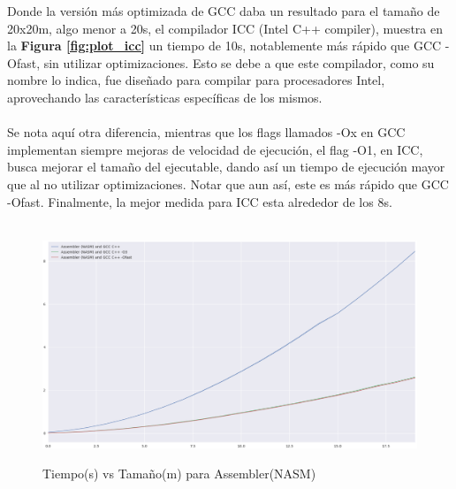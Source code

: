 Donde la versión más optimizada de GCC daba un resultado para el tamaño de 20x20m, algo menor a 20s, el compilador ICC (Intel C++ compiler), muestra en la \textbf{Figura \ref{fig:plot_icc}} un tiempo de 10s, notablemente más rápido que  GCC -Ofast, sin utilizar optimizaciones. Esto se debe a que este compilador, como su nombre lo indica, fue diseñado para compilar para procesadores Intel, aprovechando las características específicas de los mismos. 
~\\
~\\
Se nota aquí otra diferencia, mientras que los flags llamados -Ox en GCC implementan siempre mejoras de velocidad de ejecución, el flag -O1, en ICC, busca mejorar el tamaño del ejecutable, dando así un tiempo de ejecución mayor que al no utilizar optimizaciones. Notar que aun así, este es más rápido que GCC -Ofast. Finalmente, la mejor medida para ICC esta alrededor de los 8s.
~\\
~\\
\begin{figure}[!htbp]
\caption{Tiempo(s) vs Tamaño(m) para Assembler(NASM)}
\includegraphics[width=\textwidth]{imagenes/plot_asm.png}
\label{fig:plot_asm}
\end{figure}

